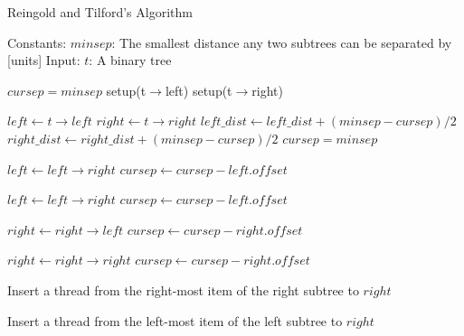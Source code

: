 \documentclass[11pt]{report}
\begin{document}
\begin{algorithm}
    \caption{Reingold and Tilford's Algorithm}\label{euclid}
    \begin{algorithmic}[1]
        \Statex Constants:
        \Statex $minsep$: The smallest distance any two subtrees can be separated by [units]
        \Statex
        \Statex Input:
        \Statex $t$: A binary tree
        \Statex
        
        \State $cursep = minsep$         
        \State setup(t$\rightarrow$left) 
        \State setup(t$\rightarrow$right)
        
        \State $left \gets t\rightarrow left$
        \State $right \gets t\rightarrow right$
         
         
        \State $left\_dist \gets left\_dist + (minsep - cursep)/2$        
        \State $right\_dist \gets right\_dist + (minsep - cursep)/2$
        \State $cursep = minsep$
        \EndIf
        
         
        \State $left \gets left \rightarrow right$
        \State $cursep \gets cursep - left.offset$
        
        \Else
        \State $left \gets left \rightarrow right$
        \State $cursep \gets cursep - left.offset$
        \EndIf
        
         
        \State $right \gets right \rightarrow left$
        \State $cursep \gets cursep - right.offset$
        \EndIf
        
        \State $right \gets right \rightarrow right$
        \State $cursep \gets cursep - right.offset$
        \EndIf
        
        \EndWhile\label{euclidendwhile}
        
         
        \State Insert a thread from the right-most item of the right subtree to $right$
        \EndIf
        
         
        \State Insert a thread from the left-most item of the left subtree to $right$
        \EndIf
        
        \EndProcedure
    \end{algorithmic}
\end{algorithm}
\end{document}
